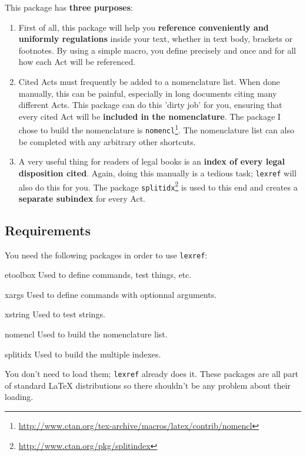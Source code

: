 \documentclass[a4paper]{ltxdockit}[2011/03/25]
\newcommand{\lexref}{\texttt{lexref}\xspace}
\begin{document}
This package has \textbf{three purposes}:
\begin{enumerate}
\item First of all, this package will help you \textbf{reference conveniently and uniformly regulations} inside your text, whether in text body, brackets or footnotes. By using a simple  macro, you define precisely and once and for all how each Act will be referenced.
\item Cited Acts must frequently be added to a nomenclature list. When done manually, this can be painful, especially in long documents citing many different Acts. This package can do this 'dirty job' for you, ensuring that every cited Act will be \textbf{included in the nomenclature}. The package I chose to build the nomenclature is \texttt{nomencl}\footnote{\url{http://www.ctan.org/tex-archive/macros/latex/contrib/nomencl}}. The nomenclature list can also be completed with any arbitrary other shortcuts.
\item A very useful thing for readers of legal books is an \textbf{index of every legal disposition cited}. Again, doing this manually is a tedious task; \lexref will also do this for you. The package \texttt{splitidx}\footnote{\url{http://www.ctan.org/pkg/splitindex}} is used to this end and creates a \textbf{separate subindex} for every Act. 
\end{enumerate}




\subsection{Requirements}

You need the following packages in order to use \lexref:
\begin{marglist}
\item[etoolbox] Used to define commands, test things, etc.
\item[xargs] Used to define commands with optionnal arguments.
\item[xstring] Used to test strings.
\item[nomencl] Used to build the nomenclature list.
\item[splitidx] Used to build the multiple indexes.
\end{marglist}

You don't need to load them; \lexref already does it.
These packages are all part of standard \LaTeX{} distributions so there shouldn't be any problem about their loading.
\end{document}
